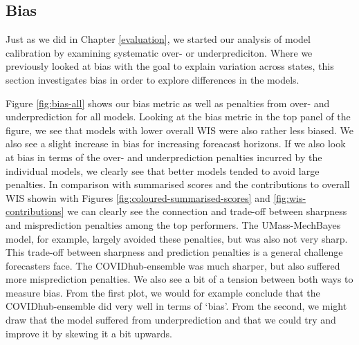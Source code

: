 \documentclass[
]{book}
\begin{document}
\hypertarget{bias}{%
\subsection{Bias}\label{bias}}

Just as we did in Chapter \ref{evaluation}, we started our analysis of model calibration by examining systematic over- or underprediciton. Where we previously looked at bias with the goal to explain variation across states, this section investigates bias in order to explore differences in the models.

Figure \ref{fig:bias-all} shows our bias metric as well as penalties from over- and underprediction for all models. Looking at the bias metric in the top panel of the figure, we see that models with lower overall WIS were also rather less biased. We also see a slight increase in bias for increasing foreacast horizons. If we also look at bias in terms of the over- and underprediction penalties incurred by the individual models, we clearly see that better models tended to avoid large penalties. In comparison with summarised scores and the contributions to overall WIS showin with Figures \ref{fig:coloured-summarised-scores} and \ref{fig:wis-contributions} we can clearly see the connection and trade-off between sharpness and misprediction penalties among the top performers. The UMass-MechBayes model, for example, largely avoided these penalties, but was also not very sharp. This trade-off between sharpness and prediction penalties is a general challenge forecasters face. The COVIDhub-ensemble was much sharper, but also suffered more misprediction penalties. We also see a bit of a tension between both ways to measure bias. From the first plot, we would for example conclude that the COVIDhub-ensemble did very well in terms of `bias'. From the second, we might draw that the model suffered from underprediction and that we could try and improve it by skewing it a bit upwards.
\end{document}
